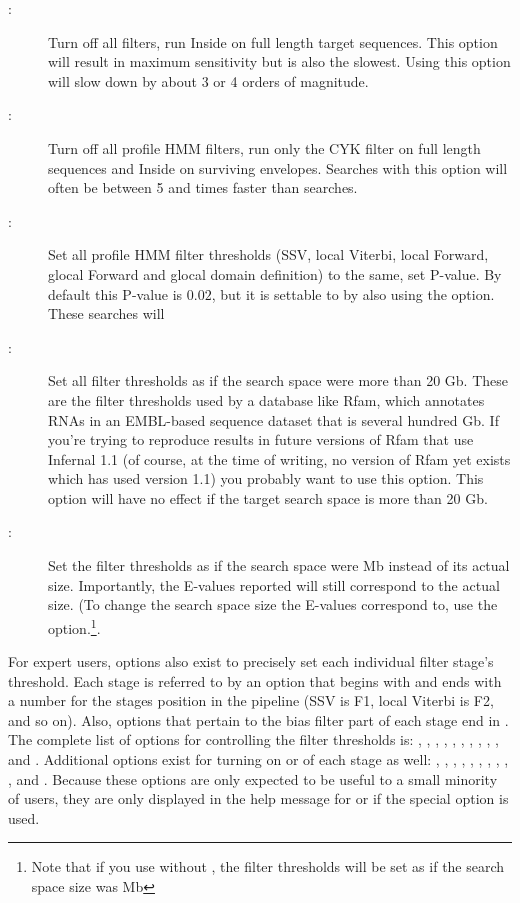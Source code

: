 \begin{description}
\item[:] Turn off all filters, run Inside on full length
  target sequences. This option will result in maximum sensitivity but
  is also the slowest. Using this option will slow down
   by about 3 or 4 orders of magnitude.
\item[:] Turn off all profile HMM filters, run only the
  CYK filter on full length sequences and Inside on surviving
  envelopes. Searches with this option will often be between 5 and
  times faster than  searches.
\item[:] Set all profile HMM filter thresholds (SSV,
  local Viterbi, local Forward, glocal Forward and glocal domain
  definition) to the same, set P-value. By default this P-value is
  $0.02$, but it is settable to  by also using the
   option. These searches will 
\item[:] Set all filter thresholds as if the search
  space were more than 20 Gb. These are the filter thresholds used by
  a database like Rfam, which annotates RNAs in an EMBL-based sequence
  dataset that is several hundred Gb. If you're trying to
  reproduce results in future versions of Rfam that use Infernal 1.1
  (of course, at the time of writing, no version of Rfam yet exists
  which has used version 1.1) you probably want to use this option.
  This option will have no effect if the target search space is more
  than 20 Gb. 
\item[:] Set the filter thresholds as if the search space
  were  Mb instead of its actual size. Importantly, the E-values
  reported will still correspond to the actual size. (To change the
  search space size the E-values correspond to, use the 
  option.\footnote{Note that if you use  without
  , the filter thresholds will be set as if the
  search space size was  Mb}.
\end{description}

For expert users, options also exist to precisely set each individual
filter stage's threshold. Each stage is referred to by an option that
begins with  and ends with a number for the stages position
in the pipeline (SSV is F1, local Viterbi is F2, and so on). Also,
options that pertain to the bias filter part of each stage end in
. The complete list of options for controlling the filter
thresholds is: , , ,
, , , ,
, , , and
. Additional options exist for turning on or of each stage
as well: , , ,
, , , ,
, , , and .
Because these options are only expected to be useful to a small
minority of users, they are only displayed in the help message for
 or  if the special 
option is used.

